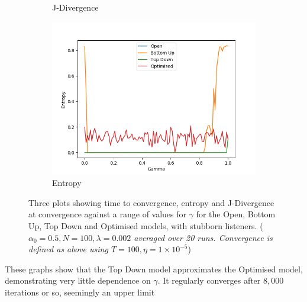 \begin{figure}[H]
\begin{subfigure}[ht]{0.45\textwidth}
    \caption{J-Divergence}
 \end{subfigure}
 \hfill
 \begin{subfigure}[ht]{0.45\textwidth}
    \includegraphics[width=\textwidth]{Images/Figures/ListenerModelPlots/Ageing/Entropy.png}
    \caption{Entropy}
 \end{subfigure}
 \caption{Three plots showing time to convergence, entropy and J-Divergence at convergence against a range of values for $\gamma$ for the Open, Bottom Up, Top Down and Optimised models, with stubborn listeners. (\textit{$\alpha_0 = 0.5, N = 100, \lambda = 0.002$ averaged over 20 runs. Convergence is defined as above using $T=100, \eta = 1\times10^{-5}$})}\label{fig:convergence_Ageing}
\end{figure}

These graphs show that the Top Down model approximates the Optimised model, demonstrating very little dependence on $\gamma$. It regularly converges after $8,000$ iterations or so, seemingly an upper limit 




